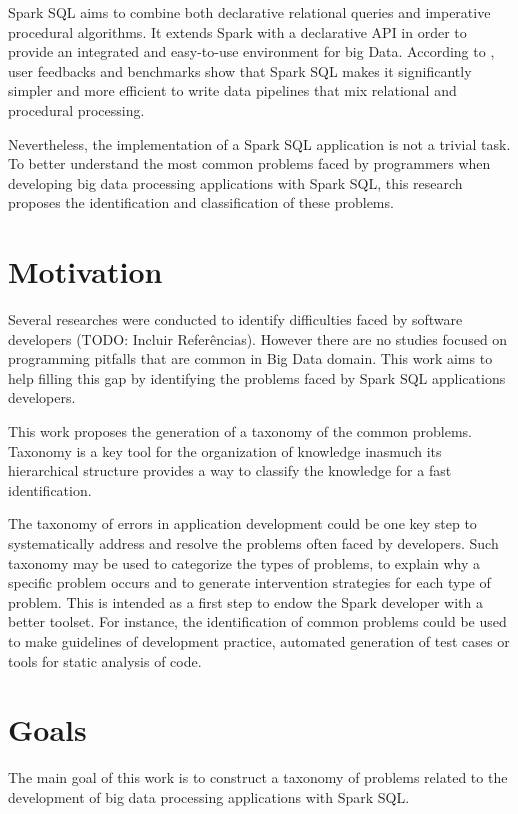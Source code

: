 Spark SQL aims to combine both declarative relational queries and imperative procedural algorithms. It extends Spark with a declarative API in order to provide an integrated and easy-to-use environment for big Data. According to \cite{armbrust2015sparksql}, user feedbacks and benchmarks show that Spark SQL makes it significantly simpler and more efficient to write data pipelines that mix relational and procedural processing. 

Nevertheless, the implementation of a Spark SQL application is not a trivial task. To better understand the most common problems faced by programmers when developing big data processing applications with Spark SQL, this research proposes the identification and classification of these problems.

\section{Motivation}

Several researches were conducted to identify difficulties faced by software developers (TODO: Incluir Referências). However there are no studies focused on programming pitfalls that are common in Big Data domain. This work aims to help filling this gap by identifying the problems faced by Spark SQL applications developers.

This work proposes the generation of a taxonomy of the common problems.  Taxonomy is a key tool for the organization of knowledge inasmuch its hierarchical structure provides a way to classify the knowledge for a fast identification. 

The taxonomy of errors in application development could be one key step to systematically address and resolve the problems often faced by developers. Such taxonomy may be used to categorize the types of problems, to explain why a specific problem occurs and to generate intervention strategies for each type of problem. This is intended as a first step to endow the Spark developer with a better toolset. For instance, the identification of common problems could be used to make guidelines of development practice, automated generation of test cases or tools for static analysis of code.

\section{Goals}

The main goal of this work is to construct a taxonomy of problems related to the development of big data processing applications with Spark SQL.

